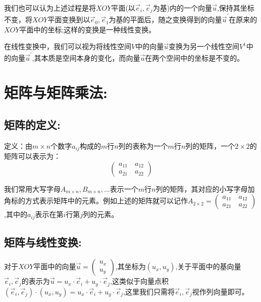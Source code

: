 \documentclass[UTF8]{article}
\begin{document}
我们也可以认为上述过程是将$XOY$平面(以$\vec{e}_i, \vec{e}_j$为基)内的一个向量$\vec{u}$,保持其坐标不变，将$XOY$平面变换到以$\vec{e}_0, \vec{e}_1$为基的平面后，随之变换得到的向量$\vec{u}^{'}$在原来的$XOY$平面中的坐标;这样的变换是一种线性变换。

在线性变换中，我们可以视为将线性空间$V$中的向量$\vec{u}$变换为另一个线性空间$V^1$中的向量$\vec{u}^{'}$,其本质是空间本身的变化，而向量$\vec{u}$在两个空间中的坐标是不变的。

\section{矩阵与矩阵乘法:}

\subsection{矩阵的定义:}
定义：由$m \times n$个数字$a_{ij}$构成的$m$行$n$列的表称为一个$m$行$n$列的矩阵，一个$2\times 2$的矩阵可以表示为：
$$\left(
\begin{array}{l}
a_{11}\quad a_{12} \\ 
a_{21}\quad a_{22}
\end{array}
\right)$$

我们常用大写字母$A_{m\times n}, B_{m\times n}, ...$表示一个$m$行$n$列的矩阵，其对应的小写字母加角标的方式表示矩阵中的元素。例如上述的矩阵就可以记作$A_{2\times 2} = \left(
\begin{array}{l}
a_{11}\quad a_{12} \\ 
a_{21}\quad a_{22}
\end{array}
\right)$,其中的$a_{ij}$表示在第$i$行第$j$列的元素。


\subsection{矩阵与线性变换:}
对于$XOY$平面中的向量$\vec{u} = \left(
\begin{array}{l}
u_x \\ 
u_y
\end{array}
\right)$,其坐标为$(u_x, u_y)$,关于平面中的基向量$\vec{e}_i, \vec{e}_j$的表示为$\vec{u} = u_x\cdot \vec{e}_i + u_y\cdot \vec{e}_j$,这类似于向量点积$(\vec{e}_i, \vec{e}_j)\cdot(u_x, u_y) = u_x\cdot \vec{e}_i + u_y\cdot \vec{e}_j$,这里我们只需将$\vec{e}_i, \vec{e}_j$视作列向量即可。
\end{document}
